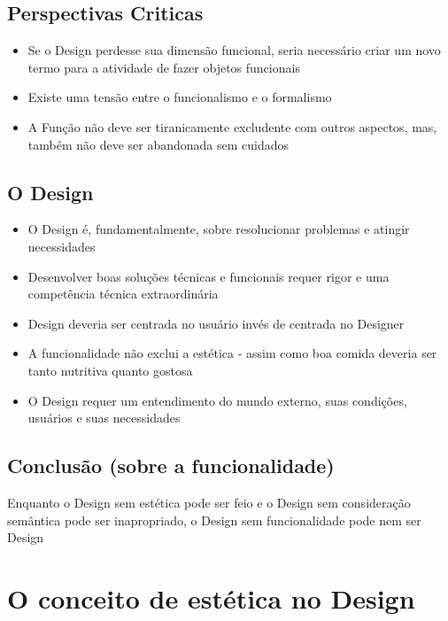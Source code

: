 \documentclass{article}
\begin{document}
\subsection{Perspectivas Criticas}
\begin{itemize}
    \item Se o Design perdesse sua dimensão funcional, seria necessário criar um novo termo para a atividade de fazer objetos funcionais
    \item Existe uma tensão entre o funcionalismo e o formalismo
    \item A Função não deve ser tiranicamente excludente com outros aspectos, mas, também não deve ser abandonada sem cuidados
\end{itemize}
\subsection{O Design}
\begin{itemize}
    \item O Design é, fundamentalmente, sobre resolucionar problemas e atingir necessidades
    \item Desenvolver boas soluções técnicas e funcionais requer rigor e uma competência técnica extraordinária
    \item Design deveria ser centrada no usuário invés de centrada no Designer
    \item A funcionalidade não exclui a estética - assim como boa comida deveria ser tanto nutritiva quanto gostosa
    \item O Design requer um entendimento do mundo externo, suas condições, usuários e suas necessidades
\end{itemize}
\subsection{Conclusão (sobre a funcionalidade)}
Enquanto o Design sem estética pode ser feio e o Design sem consideração semântica pode ser inapropriado, o Design sem funcionalidade pode nem ser Design

\newpage
\section{O conceito de estética no Design}
\end{document}
